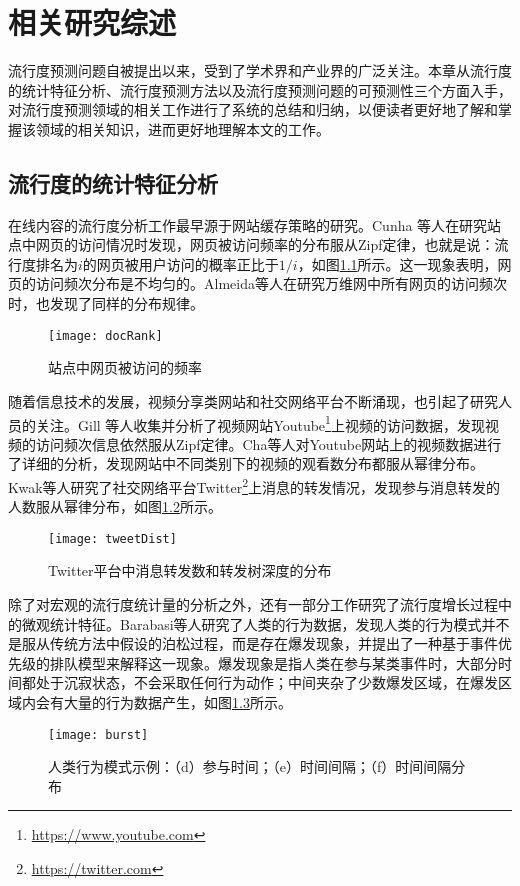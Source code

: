 
\chapter{相关研究综述}
\label{chap:relatedwork}
流行度预测问题自被提出以来，受到了学术界和产业界的广泛关注。本章从流行度的统计特征分析、流行度预测方法以及流行度预测问题的可预测性三个方面入手，对流行度预测领域的相关工作进行了系统的总结和归纳，以便读者更好地了解和掌握该领域的相关知识，进而更好地理解本文的工作。

\section{流行度的统计特征分析}
在线内容的流行度分析工作最早源于网站缓存策略的研究\citep{cunha1995characteristics,almeida1996characterizing,breslau1999web,barford1999changes}。Cunha 等人\citep{cunha1995characteristics}在研究站点中网页的访问情况时发现，网页被访问频率的分布服从Zipf定律\citep{zipf2016human}，也就是说：流行度排名为$i$的网页被用户访问的概率正比于$1/i$，如图\ref{fig:pageDist}所示。这一现象表明，网页的访问频次分布是不均匀的。Almeida等人\citep{almeida1996characterizing}在研究万维网中所有网页的访问频次时，也发现了同样的分布规律。
\begin{figure}[!htbp]
  \centering
  \texttt{[image: docRank]}
  \caption{站点中网页被访问的频率\citep{cunha1995characteristics}}
  \label{fig:pageDist}
\end{figure}

随着信息技术的发展，视频分享类网站和社交网络平台不断涌现，也引起了研究人员的关注\citep{chesire2001measurement,almeida2001analysis,sripanidkulchai2004analysis,
yu2006understanding,gill2007youtube,cha2009analyzing}。Gill 等人\citep{gill2007youtube}收集并分析了视频网站Youtube\footnote{\url{https://www.youtube.com}}上视频的访问数据，发现视频的访问频次信息依然服从Zipf定律。Cha等人\citep{cha2009analyzing}对Youtube网站上的视频数据进行了详细的分析，发现网站中不同类别下的视频的观看数分布都服从幂律分布。Kwak等人\citep{kwak2010twitter}研究了社交网络平台Twitter\footnote{\url{https://twitter.com}}上消息的转发情况，发现参与消息转发的人数服从幂律分布，如图\ref{fig:tweetDist}所示。
\begin{figure}[!htbp]
  \centering
  \texttt{[image: tweetDist]}
  \caption{Twitter平台中消息转发数和转发树深度的分布\citep{kwak2010twitter}}
  \label{fig:tweetDist}
\end{figure}

除了对宏观的流行度统计量的分析之外，还有一部分工作研究了流行度增长过程中的微观统计特征。Barabasi等人\citep{barabasi05}研究了人类的行为数据，发现人类的行为模式并不是服从传统方法中假设的泊松过程，而是存在爆发现象，并提出了一种基于事件优先级的排队模型来解释这一现象。爆发现象是指人类在参与某类事件时，大部分时间都处于沉寂状态，不会采取任何行为动作；中间夹杂了少数爆发区域，在爆发区域内会有大量的行为数据产生，如图\ref{fig:burst}所示。
\begin{figure}[!htbp]
  \centering
  \texttt{[image: burst]}
  \caption{人类行为模式示例\citep{barabasi05}：（d）参与时间；（e）时间间隔；（f）时间间隔分布}
  \label{fig:burst}
\end{figure}

